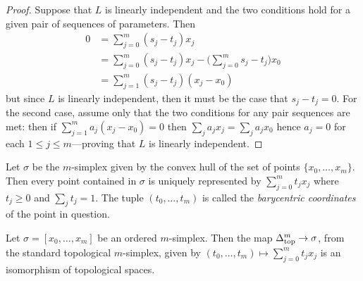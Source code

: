 \begin{proof}
    Suppose that \(L\) is linearly independent and the two conditions hold for a given
    pair of sequences of parameters. Then
    \begin{align*}
        0 & = \sum_{j=0}^m (s_j - t_j) x_j                                          \\
          & = \sum_{j=0}^m (s_j - t_j) x_j - \Big( \sum_{j=0}^m s_j - t_j \Big) x_0 \\
          & = \sum_{j=1}^{m} (s_j - t_j) (x_j - x_0)
    \end{align*}
    but since \(L\) is linearly independent, then it must be the case that
    \(s_j - t_j = 0\). For the second case, assume only that the two conditions for
    any pair sequences are met: then if \(\sum_{j=1}^m a_j (x_j - x_0) = 0\) then
    \(\sum_j a_j x_j = \sum_j a_j x_0\) hence \(a_j = 0\) for each
    \(1 \leq j \leq m\)---proving that \(L\) is linearly independent.
\end{proof}

\begin{corollary}
    \label{cor:barycentric-coordinates-simplex}
    Let \(\sigma\) be the \(m\)-simplex given by the convex hull of the set of
    points \(\{x_0, \dots, x_m\}\). Then every point contained in \(\sigma\) is
    uniquely represented by \(\sum_{j=0}^m t_j x_j\) where \(t_j \geq 0\) and
    \(\sum_j t_j = 1\). The tuple \((t_0, \dots, t_m)\) is called the
    \emph{barycentric coordinates} of the point in question.
\end{corollary}

\begin{corollary}
    \label{cor:ordered-simplex-iso-standard-simplex}
    Let \(\sigma = [x_0, \dots, x_m]\) be an ordered \(m\)-simplex. Then the  map
    \(\Delta_{\text{top}}^m \to \sigma\), from the standard topological \(m\)-simplex, given by
    \((t_0, \dots, t_m) \mapsto \sum_{j=0}^m t_j x_j\) is an isomorphism of
    topological spaces.
\end{corollary}

